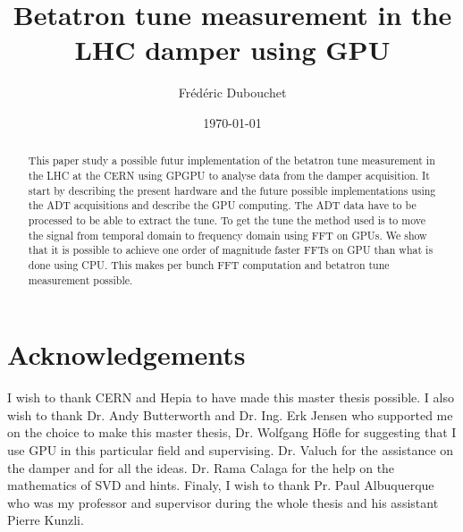 \documentclass[a4paper]{report}
\title{Betatron tune measurement in the LHC damper using GPU}
\author{Fr{\'e}d{\'e}ric Dubouchet}
\date{\today}
\begin{document}
\maketitle

\begin{abstract}
	This paper study a possible futur implementation of the betatron tune measurement in the \gls{LHC} at the \gls{CERN} using \gls{GPGPU} to analyse data from the \gls{damper} acquisition. It start by describing the present hardware and the future possible implementations using the \gls{ADT} acquisitions and describe the \gls{GPU} computing. The \gls{ADT} data have to be processed to be able to extract the \gls{tune}. To get the tune the method used is to move the signal from temporal domain to frequency domain using \gls{FFT} on \glspl{GPU}. We show that it is possible to achieve one order of magnitude faster \glspl{FFT} on \gls{GPU} than what is done using \gls{CPU}. This makes per \gls{bunch} \gls{FFT} computation and betatron tune measurement possible.  
\end{abstract}

\chapter*{Acknowledgements}
	I wish to thank \gls{CERN} and \gls{Hepia} to have made this master thesis possible. I also wish to thank Dr. Andy Butterworth and Dr. Ing. Erk Jensen who supported me on the choice to make this master thesis, Dr. Wolfgang H{\"o}fle for suggesting that I use GPU in this particular field and supervising. Dr. Valuch for the assistance on the damper and for all the ideas. Dr. Rama Calaga for the help on the mathematics of \gls{SVD} and hints. Finaly, I wish to thank Pr. Paul Albuquerque who was my professor and supervisor during the whole thesis and his assistant Pierre Kunzli.

\tableofcontents
\listoffigures
\listoftables








\printglossaries


\end{document}
